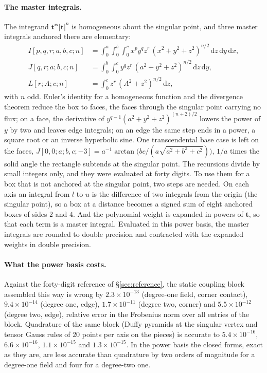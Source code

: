 \documentclass[11pt,a4paper]{article}
\newcommand{\bt}{\mathbf{t}}
\newcommand{\balpha}{\boldsymbol{\alpha}}
\newcommand{\dd}{\mathrm{d}}
\begin{document}
\paragraph{The master integrals.} The integrand $\bt^{\balpha}|\bt|^n$ is homogeneous about the
singular point, and three master integrals anchored there are elementary:
\begin{align}
  I[p,q,r;a,b,c;n]&=\int_0^a\!\!\int_0^b\!\!\int_0^c x^py^qz^r\,(x^2+y^2+z^2)^{n/2}\,\dd z\,\dd y\,\dd x,
  \label{eq:boxI}\\
  J[q,r;a;b,c;n]&=\int_0^b\!\!\int_0^c y^qz^r\,(a^2+y^2+z^2)^{n/2}\,\dd z\,\dd y,\label{eq:faceJ}\\
  L[r;A;c;n]&=\int_0^c z^r\,(A^2+z^2)^{n/2}\,\dd z,\label{eq:lineL}
\end{align}
with $n$ odd. Euler's identity for a homogeneous function and the divergence theorem reduce the box to
faces, the faces through the singular point carrying no flux; on a face, the derivative of
$y^{q-1}(a^2+y^2+z^2)^{(n+2)/2}$ lowers the power of $y$ by two and leaves edge integrals; on an edge the
same step ends in a power, a square root or an inverse hyperbolic sine. One transcendental base case is
left on the faces, $J[0,0;a;b,c;-3]=a^{-1}\arctan\bigl(bc/(a\sqrt{a^2+b^2+c^2})\bigr)$, $1/a$ times the
solid angle the rectangle subtends at the singular point. The recursions divide by small integers only,
and they were evaluated at forty digits. To use them for a box that is not anchored at the singular point,
two steps are needed. On each axis an integral from $l$ to $u$ is the difference of two integrals from the
origin (the singular point), so a box at a distance becomes a signed sum of eight anchored boxes of sides
$2$ and $4$. And the polynomial weight is expanded in powers of $\bt$, so that each term is a master
integral. Evaluated in this power basis, the master integrals are rounded to double precision and
contracted with the expanded weights in double precision.

\paragraph{What the power basis costs.} Against the forty-digit reference of \S\ref{sec:reference}, the static
coupling block assembled this way is wrong by $2.3\times10^{-13}$ (degree-one field, corner contact),
$9.4\times10^{-14}$ (degree one, edge), $1.7\times10^{-11}$ (degree two, corner) and $5.5\times10^{-12}$
(degree two, edge), relative error in the Frobenius norm over all entries of the block. Quadrature of the
same block (Duffy pyramids at the singular vertex and tensor Gauss rules of $20$ points per axis on the
pieces) is accurate to $5.4\times10^{-16}$, $6.6\times10^{-16}$, $1.1\times10^{-15}$ and $1.3\times10^{-15}$.
In the power basis the closed forms, exact as they are, are less accurate than quadrature by two orders
of magnitude for a degree-one field and four for a degree-two one.
\end{document}

